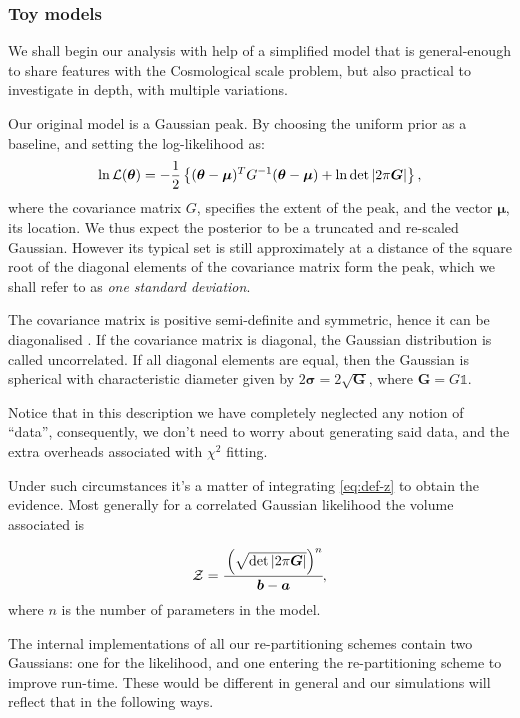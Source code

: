 \documentclass[usenatbib]{mnras}
\begin{document}
\subsubsection{Toy models}
\label{sec:org8abb6b0}

We shall begin our analysis with help of a simplified model that
is general-enough to share features with the Cosmological scale
problem, but also practical to investigate in depth, with multiple
variations.

Our original model is a Gaussian peak. By choosing the uniform
prior as a baseline, and setting the log-likelihood as:
\begin{equation*}
  \ln {\cal L}(\bm{\theta}) = - \dfrac{1}{2} \left\{(\bm{\theta} - \bm{\mu})^{T}G^{-1}(\bm{\theta}-\bm{\mu})  + \ln \det \left| 2\mathrm{\pi} \bm{G}\right| \right\},
\end{equation*}
where the covariance matrix \(G\), specifies the extent of the
peak, and the vector \(\bm{\mu}\), its location. We thus expect the
posterior to be a truncated and re-scaled Gaussian. However its
typical set is still approximately at a distance of the square
root of the diagonal elements of the covariance matrix form the
peak, which we shall refer to as \emph{one standard deviation}.

The covariance matrix is positive semi-definite and symmetric,
hence it can be diagonalised \citep{taboga2017lectures}. If the
covariance matrix is diagonal, the Gaussian distribution is called
uncorrelated. If all diagonal elements are equal, then the
Gaussian is spherical with characteristic diameter given by \(2
	\bm{\sigma} = 2\sqrt{\bm{G}}\), where \(\bm{G} = G \mathds{1}\).

Notice that in this description we have completely neglected any
notion of ``data'', consequently, we don't need to worry about
generating said data, and the extra overheads associated with
\(\chi^2\) fitting.

Under such circumstances it's a matter of integrating \autoref{eq:def-z}
to obtain the evidence. Most generally for a correlated Gaussian
likelihood the volume associated is

\begin{equation}\label{eq:evidence}
   {\cal Z} = \cfrac{\left( \sqrt{ \det \left| 2\mathrm{\pi} \bm{G} \right|} \right)^{n}}{\bm{b}-\bm{a}}, 
\end{equation}
where \(n\) is the number of parameters in the model.

The internal implementations of all our re-partitioning schemes
contain two Gaussians: one for the likelihood, and one entering
the re-partitioning scheme to improve run-time. These would be
different in general and our simulations will reflect that in the
following ways.
\end{document}

